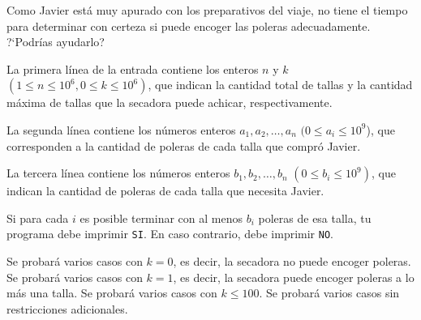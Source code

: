 \documentclass{oci}
\begin{document}
\begin{problemDescription}
Como Javier está muy apurado con los preparativos del viaje, no tiene el tiempo para determinar
con certeza si puede encoger las poleras adecuadamente.
?`Podrías ayudarlo?
\end{problemDescription}

\begin{inputDescription}
La primera línea de la entrada contiene los enteros $n$ y $k$ $(1 \leq n \leq 10^6, 0 \leq k \leq 10^6)$,
que indican la cantidad total de tallas y la cantidad máxima de tallas que la secadora puede achicar, respectivamente.

La segunda línea contiene los números enteros $a_1, a_2, \dots, a_n$ $(0 \leq a_i \leq 10^9$),
que corresponden a la cantidad de poleras de cada talla que compró Javier.

La tercera línea contiene los números enteros $b_1, b_2, \dots, b_n$ $(0 \leq b_i \leq 10^9)$, que indican
la cantidad de poleras de cada talla que necesita Javier.
\end{inputDescription}

\begin{outputDescription}
Si para cada $i$ es posible terminar con al menos $b_i$
poleras de esa talla, tu programa debe imprimir \texttt{SI}.
En caso contrario, debe imprimir \texttt{NO}.
\end{outputDescription}

\begin{scoreDescription}
  Se probará varios casos con $k=0$, es decir, la secadora no puede encoger poleras.
  Se probará varios casos con $k=1$, es decir, la secadora puede encoger poleras a lo más una talla.
  Se probará varios casos con $k \leq 100$.
  Se probará varios casos sin restricciones adicionales.
\end{scoreDescription}
\end{document}

